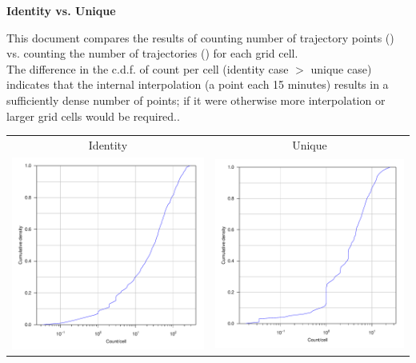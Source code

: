 \documentclass{article}
\begin{document}
\begin{center}
\textbf{\LARGE{Identity vs. Unique}}
\end{center}

This document compares the results of counting number of trajectory points (\verb@identity@) vs. counting the number of trajectories (\verb@unique@) for each grid cell.\\

The difference in the c.d.f. of count per cell (identity case $>$ unique case) indicates that the internal interpolation (a point each 15 minutes) results in a sufficiently dense number of points; if it were otherwise more interpolation or larger grid cells would be required.. 
\begin{center} \begin{tabular}{cc}
    Identity & Unique \\
    \includegraphics[width=.4\textwidth]{identitypg1.pdf} & \includegraphics[width=.4\textwidth]{uniquepg1.pdf} \end{tabular} \end{center}
\end{document}
